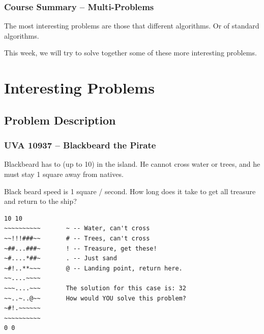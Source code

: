 \documentclass{beamer}
\begin{document}
\begin{frame}
  \frametitle{Course Summary -- Multi-Problems}

  The most interesting problems are those that  different algorithms. Or  of
  standard algorithms.

  \bigskip

  This week, we will try to solve together some of these more
  interesting problems.
\end{frame}

\section{Interesting Problems}
\subsection{Problem Description}


\begin{frame}[fragile]
  \frametitle{UVA 10937 -- Blackbeard the Pirate}

  {\smaller

    \begin{block}{}
      Blackbeard has to  (up to 10)
      in the island. He \alert{cannot cross} water or trees, and he
      must stay 1 square away from natives.

      \medskip

      Black beard speed is 1 square / second. How long does it take
      to get all treasure and return to the ship?
    \end{block}

\begin{verbatim}
10 10
~~~~~~~~~~       ~ -- Water, can't cross
~~!!!###~~       # -- Trees, can't cross
~##...###~       ! -- Treasure, get these!
~#....*##~       . -- Just sand
~#!..**~~~       @ -- Landing point, return here.
~~....~~~~
~~~....~~~       The solution for this case is: 32
~~..~..@~~       How would YOU solve this problem?
~#!.~~~~~~
~~~~~~~~~~
0 0
\end{verbatim}
}
\end{frame}
\end{document}
